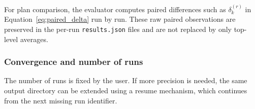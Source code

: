 For plan comparison, the evaluator computes paired differences such as
$\delta_k^{(r)}$ in Equation~\eqref{eq:paired_delta} run by run. These raw
paired observations are preserved in the per-run \texttt{results.json} files
and are not replaced by only top-level averages.

\subsubsection{Convergence and number of runs}
\label{sssec:mc_convergence}
The number of runs is fixed by the user. If more
precision is needed, the same output directory can be extended using a 
resume mechanism, which continues from the next missing run identifier.
